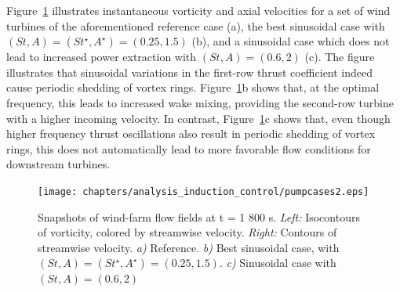 Figure~\ref{fig:vorticity_parametersweep} illustrates instantaneous vorticity and axial velocities for a set of wind turbines of the aforementioned reference case (a), the best sinusoidal case with $(St, A) = (St^\star, A^\star)= (0.25, 1.5)$ (b), and a sinusoidal case which does not lead to increased power extraction with $(St, A) = (0.6, 2)$ (c). The figure illustrates that sinusoidal variations in the first-row thrust coefficient indeed cause periodic shedding of vortex rings. Figure~\ref{fig:vorticity_parametersweep}b shows that, at the optimal frequency, this leads to increased wake mixing, providing the second-row turbine with a higher incoming velocity. In contrast, Figure~\ref{fig:vorticity_parametersweep}c shows that, even though higher frequency thrust oscillations also result in periodic shedding of vortex rings, this does not automatically lead to more favorable flow conditions for downstream turbines. 
\begin{figure}
	\centering
	\texttt{[image: chapters/analysis\_induction\_control/pumpcases2.eps]}
	\caption{Snapshots of wind-farm flow fields at t = 1 800 s. \emph{Left: } Isocontours of vorticity, colored by streamwise velocity. \emph{Right: } Contours of streamwise velocity. \emph{a)} Reference. \emph{b)} Best sinusoidal case, with $(St , A) = (St^\star, A^\star) = (0.25, 1.5)$. \emph{c)} Sinusoidal case with $(St, A) = (0.6, 2)$ \label{fig:vorticity_parametersweep}  }
\end{figure}

